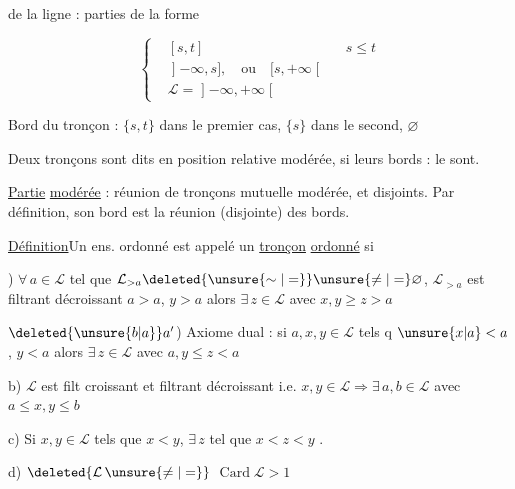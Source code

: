  de la ligne : parties
de la forme

\[
\left\{\begin{aligned}
 &[s,t] &&s\leq t\\
 &\mathopen{]}-\infty,s],\quad\text{ou}\quad [s,+\infty\mathclose{[}\\
 &\mathcal L=\mathopen{]}-\infty,+\infty\mathclose{[}
\end{aligned}\right.
\]

Bord du tronçon : $\{s,t\}$ dans le
premier cas, $\{s\}$ dans le second, $\varnothing$ 

Deux tronçons sont dits en
position relative modérée, si leurs
bords : le sont.

\uline{Partie} \uline{modérée} :
réunion  de tronçons  mutuelle
modérée, et disjoints.  Par
définition, son bord est la réunion
(disjointe) des bords.




\uline{Définition}\quad Un ens. ordonné  est appelé un \uline{tronçon} \uline{ordonné} si

) $\forall\,a\in\mathcal L$ tel que $\mathcal L_{>a}\deleted{\unsure{\sim|=}}\unsure{\ne|=}\varnothing$, $\mathcal L_{>a}$ est filtrant décroissant
 
$a>a$, $y>a$ alors $\exists\,z\in\mathcal L$ avec $x,y\geq z>a$

$\deleted{\unsure{b|a}}a'$) Axiome dual : si $a,x,y\in\mathcal L$ tels q
$\unsure{x|a}<a$, $y<a$ alors $\exists\,z\in\mathcal L$ avec $a,y\leq z<a$

b) $\mathcal L$ est filt croissant et filtrant décroissant i.e.
$x,y\in\mathcal L\Rightarrow\exists\,a,b\in\mathcal L$ avec $a\leq x,y\leq b$

c) Si $x,y\in\mathcal L$ tels que $x<y$, $\exists\,z$ tel que $x<z<y$ .

d) $\deleted{\mathcal L\,\unsure{\ne|=}}$ $\operatorname{Card}\mathcal L>1$ 

